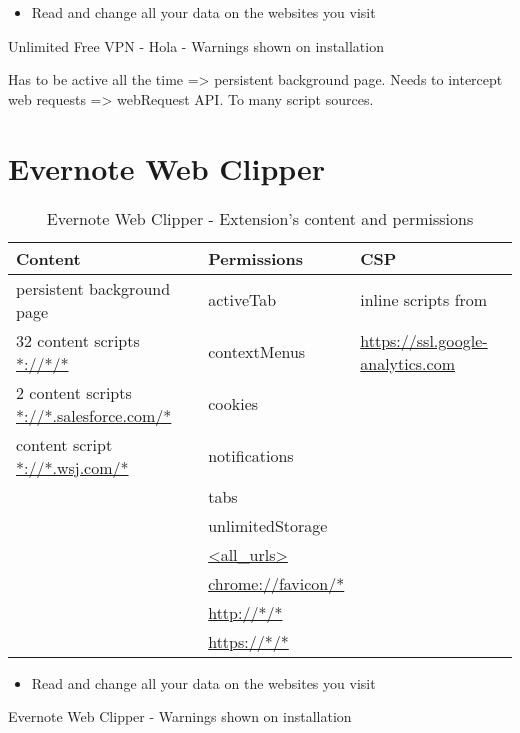 	\begin{listing}
		\begin{itemize}
			\item  Read and change all your data on the websites you visit
		\end{itemize}
		\caption{Unlimited Free VPN - Hola - Warnings shown on installation}
	\end{listing}
	
	Has to be active all the time => persistent background page. Needs to intercept web requests => webRequest API. 
	To many script sources.
	
\section{Evernote Web Clipper}
	
	\begin{table}[h]
		\centering
		\begin{tabular}{|l|l|l|} \hline
			\textbf{Content} & \textbf{Permissions} & \textbf{CSP} \\ \hline
			persistent background page & activeTab & inline scripts from  \\
			32 content scripts  \url{*://*/*} & contextMenus & \hspace{1em} \url{https://ssl.google-analytics.com} \\
			2 content scripts \url{*://*.salesforce.com/*} & cookies & \\ 
			content script \url{*://*.wsj.com/*} & notifications & \\ 
			& tabs & \\ 
			& unlimitedStorage & \\ 
			& \url{<all_urls>} & \\ 
			& \url{chrome://favicon/*} & \\ 
			& \url{http://*/*} & \\ 
			& \url{https://*/*} & \\ \hline
		\end{tabular}
		\caption{Evernote Web Clipper - Extension's content and permissions}
	\end{table}
	
	\begin{listing}
		\begin{itemize}
			\item  Read and change all your data on the websites you visit
		\end{itemize}
		\caption{Evernote Web Clipper - Warnings shown on installation}
	\end{listing}
